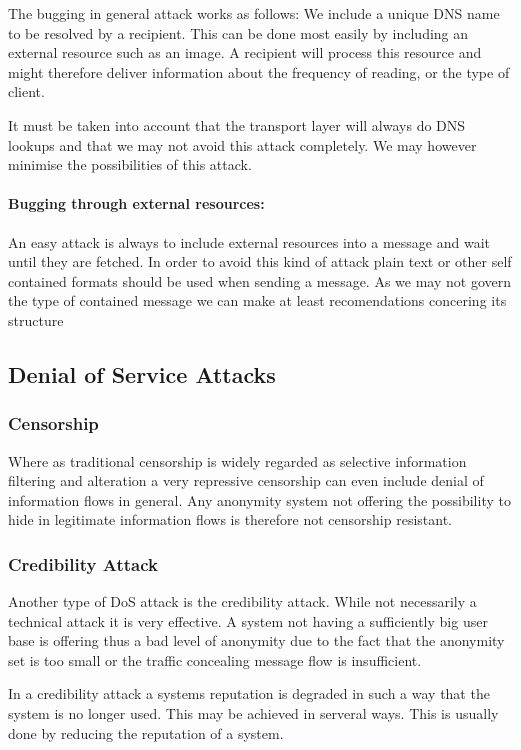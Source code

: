 The bugging in general attack works as follows: We include a unique DNS name to be resolved by a recipient. This can be done most easily by including an external resource such as an image. A recipient will process this resource and might therefore deliver information about the frequency of reading, or the type of client. 

It must be taken into account that the transport layer will always do DNS lookups and that we may not avoid this attack completely. We may however minimise the possibilities of this attack.

\paragraph{Bugging through external resources:} An easy attack is always to include external resources into a message and wait until they are fetched. In order to avoid this kind of attack plain text or other self contained formats should be used when sending a message. As we may not govern the type of contained message we can make at least recomendations concering its structure

\subsection{Denial of Service Attacks}
\subsubsection{Censorship}
Where as traditional censorship is widely regarded as selective information filtering and alteration a very repressive censorship can even include denial of information flows in general. Any anonymity system not offering the possibility to hide in legitimate information flows is therefore not censorship resistant.

\subsubsection{Credibility Attack}
Another type of DoS attack is the credibility attack. While not necessarily a technical attack it is very effective. A system not having a sufficiently big user base is offering thus a bad level of anonymity due to the fact that the anonymity set is too small or the traffic concealing message flow is insufficient. 

In a credibility attack a systems reputation is degraded in such a way that the system is no longer used. This may be achieved in serveral ways. This is usually done by reducing the reputation of a system.

